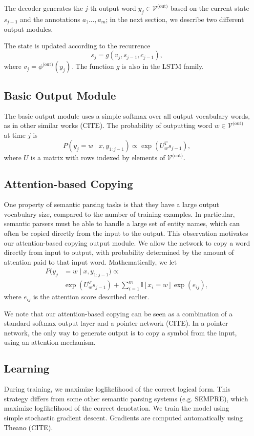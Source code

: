 \documentclass[11pt,letterpaper]{article}
\newcommand{\vocabout}{\mathcal{V}^{\text{(out)}}}
\newcommand{\phiout}{\phi^{\text{(out)}}}
\begin{document}
The decoder generates the $j$-th output word $y_j \in \vocabout$ based on 
the current state $s_{j-1}$ and the annotations $a_1 \dotsc, a_m$;
in the next section, we describe two different output modules.

The state is updated according to the recurrence \[
  s_j = g(v_j, s_{j-1}, c_{j-1}),
\]
where $v_j = \phiout(y_j)$.
The function $g$ is also in the LSTM family.

\subsection{Basic Output Module}
The basic output module uses a simple softmax over all
output vocabulary words, as in other similar works (CITE).
The probability of outputting word $w \in \vocabout$ at time $j$ is \[
  P(y_j = w \mid x, y_{1:j-1}) \propto \exp(U_{w}^T s_{j-1}),
\]
where $U$ is a matrix with rows indexed by elements of $\vocabout$.

\subsection{Attention-based Copying}
One property of semantic parsing tasks is that they have a large
output vocabulary size, compared to the number of training examples.
In particular, semantic parsers must be able to handle a large set of
entity names, which can often be copied directly from the input to the output.
This observation motivates our attention-based copying output module.
We allow the network to copy a word directly from input to output,
with probability determined by the amount of attention paid to that input word.
Mathematically, we let 
\begin{align*}
  P(y_j &= w \mid x, y_{1:j-1}) \propto 
  \\ &\exp(U_{w}^T s_{j-1})
  + \sum_{i=1}^m \mathbb{I}[x_i = w] \exp(e_{ij}),
\end{align*}
where $e_{ij}$ is the attention score described earlier.

We note that our attention-based copying can be seen as a 
combination of a standard softmax output layer
and a pointer network (CITE).  In a pointer network,
the only way to generate output is to copy a symbol from the input,
using an attention mechanism.

\subsection{Learning}
During training, we maximize loglikelihood of the correct
logical form.
This strategy differs from some other semantic parsing systems
(e.g. SEMPRE), which maximize loglikelihood of the correct
denotation.  
We train the model using simple stochastic gradient descent.
Gradients are computed automatically using Theano (CITE).
\end{document}
